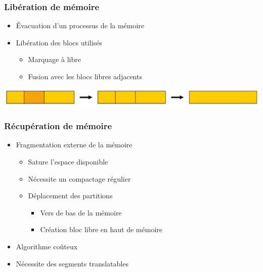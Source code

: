 \begin{frame}
\frametitle{Libération de mémoire}
\begin{itemize}
\item Évacuation d'un processus de la mémoire
\item Libération des blocs utilisés
\begin{itemize}
\item Marquage à libre
\item Fusion avec les blocs libres adjacents
\end{itemize}
\end{itemize}
\includegraphics[width=\textwidth]{../illustration/memoire_principale_liberation_bloc.pdf}
\end{frame}


\begin{frame}
\frametitle{Récupération de mémoire}
\begin{itemize}
\item Fragmentation externe de la mémoire
\begin{itemize}
\item Sature l’espace disponible
\item Nécessite un compactage régulier
\item Déplacement des partitions
\begin{itemize}
\item Vers de bas de la mémoire
\item Création bloc libre en haut de mémoire
\end{itemize}
\end{itemize}

\item Algorithme coûteux
\item Nécessite des segments translatables
\end{itemize}
\end{frame}

